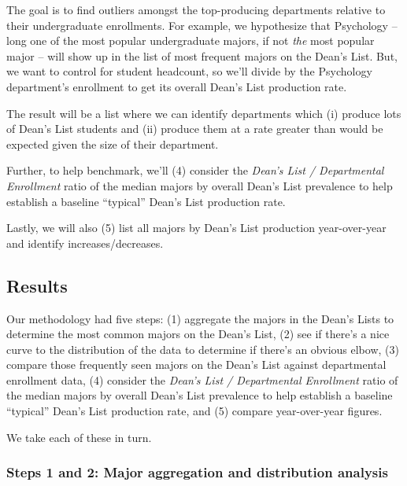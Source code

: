 \documentclass[10pt]{article}
\begin{document}
The goal is to find outliers amongst the top-producing departments relative to their undergraduate enrollments. For example, we hypothesize that Psychology -- long one of the most popular undergraduate majors, if not \textit{the} most popular major -- will show up in the list of most frequent majors on the Dean's List. But, we want to control for student headcount, so we'll divide by the Psychology department's enrollment to get its overall Dean's List production rate.

The result will be a list where we can identify departments which (i) produce lots of Dean's List students and (ii) produce them at a rate greater than would be expected given the size of their department.

Further, to help benchmark, we'll (4) consider the \textit{Dean's List / Departmental Enrollment} ratio of the median majors by overall Dean's List prevalence to help establish a baseline ``typical'' Dean's List production rate.

Lastly, we will also (5) list all majors by Dean's List production year-over-year and identify increases/decreases.

\subsection{Results}
Our methodology had five steps: (1) aggregate the majors in the Dean's Lists to determine the most common majors on the Dean's List, (2) see if there's a nice curve to the distribution of the data to determine if there's an obvious elbow, (3) compare those frequently seen majors on the Dean's List against departmental enrollment data, (4) consider the \textit{Dean's List / Departmental Enrollment} ratio of the median majors by overall Dean's List prevalence to help establish a baseline ``typical'' Dean's List production rate, and (5) compare year-over-year figures.

We take each of these in turn.

\subsubsection{Steps 1 and 2: Major aggregation and distribution analysis}

\qquad
\end{document}
